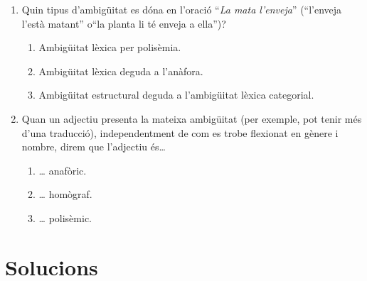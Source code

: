 \begin{enumerate}
\item Quin tipus d'ambigüitat es dóna en l'oració ``\emph{La mata
    l'enveja}'' (``l'enveja l'està matant'' o``la planta li té enveja
  a ella'')? 
  \begin{enumerate}
  \item Ambigüitat lèxica per polisèmia.
  \item Ambigüitat lèxica deguda a l'anàfora.
  \item Ambigüitat estructural deguda a l'ambigüitat lèxica
    categorial.
  \end{enumerate}

\item Quan un adjectiu presenta la mateixa ambigüitat (per exemple,
  pot tenir més d'una traducció), independentment de com es trobe
  flexionat en gènere i nombre, direm que l'adjectiu és{\ldots}
  \begin{enumerate}
  \item {\ldots} anafòric.
  \item {\ldots} homògraf.
  \item {\ldots} polisèmic.
  \end{enumerate}
  




\end{enumerate}

\section{Solucions}

